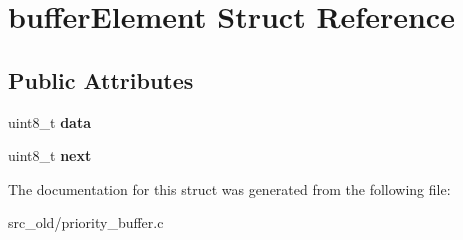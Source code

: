 \hypertarget{structbufferElement}{}\section{buffer\+Element Struct Reference}
\label{structbufferElement}
\subsection*{Public Attributes}
\begin{DoxyCompactItemize}
\item 
\mbox{\label{structbufferElement_aaa61d3a8cb1d6d3cf20cd26e0b586eb0}} 
uint8\+\_\+t {\bfseries data}
\item 
\mbox{\label{structbufferElement_adafdc332ceca8f44548d6079bd4ac14b}} 
uint8\+\_\+t {\bfseries next}
\end{DoxyCompactItemize}


The documentation for this struct was generated from the following file\+:\begin{DoxyCompactItemize}
\item 
src\+\_\+old/priority\+\_\+buffer.\+c\end{DoxyCompactItemize}
